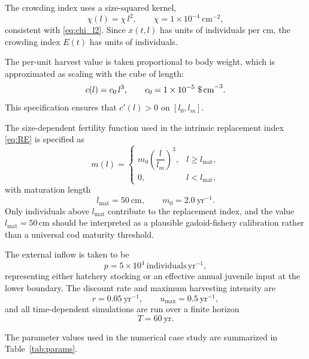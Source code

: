 \documentclass[pdflatex,sn-mathphys-num]{sn-jnl}
\theoremstyle{thmstyleone}
\theoremstyle{definition}
\theoremstyle{remark}
\begin{document}
The crowding index uses a size-squared kernel,
\[
\chi(l)=\chi\,l^2,\qquad \chi=1\times 10^{-4}\ \mathrm{cm}^{-2},
\]
consistent with \eqref{eq:chi_l2}. Since $x(t,l)$ has units of individuals per cm, the crowding index $E(t)$ has units of individuals.

The per-unit harvest value is taken proportional to body weight, which is approximated as scaling with the cube of length:
\begin{equation}\label{eq:cL_num}
c(l)=c_0\,l^3,\qquad c_0=1\times 10^{-5}\ \text{\$\,cm}^{-3}.
\end{equation}
This specification ensures that $c'(l)>0$ on $[l_0,l_m]$.

The size-dependent fertility function used in the intrinsic replacement index \eqref{eq:RE} is specified as
\begin{equation}\label{eq:mL_num}
m(l)=
\begin{cases}
m_0\left(\dfrac{l}{l_m}\right)^3, & l\ge l_{\mathrm{mat}},\\[4pt]
0, & l<l_{\mathrm{mat}},
\end{cases}
\end{equation}
with maturation length
\[
l_{\mathrm{mat}}=50\ \text{cm},
\qquad
m_0=2.0\ \mathrm{yr}^{-1}.
\]
Only individuals above $l_{\mathrm{mat}}$ contribute to the replacement index, and the value $l_{\mathrm{mat}}=50$\,cm should be interpreted as a plausible gadoid-fishery calibration rather than a universal cod maturity threshold.

The external inflow is taken to be
\[
p=5\times 10^4\ \mathrm{individuals}\,\mathrm{yr}^{-1},
\]
representing either hatchery stocking or an effective annual juvenile input at the lower boundary. The discount rate and maximum harvesting intensity are
\[
r=0.05\ \mathrm{yr}^{-1},
\qquad
u_{\max}=0.5\ \mathrm{yr}^{-1},
\]
and all time-dependent simulations are run over a finite horizon
\[
T=60\ \text{yr}.
\]

The parameter values used in the numerical case study are summarized in Table~\ref{tab:params}.
\end{document}
